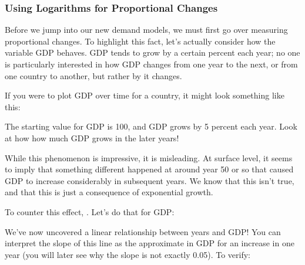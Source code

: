\documentclass[letterpaper,10pt,english]{jupyterBook}
\begin{document}
\subsubsection{Using Logarithms for Proportional Changes}
\label{\detokenize{content/01-demand/03-log-log:using-logarithms-for-proportional-changes}}
\sphinxAtStartPar
Before we jump into our new demand models, we must first go over measuring proportional changes.
To highlight this fact, let’s actually consider how the variable GDP behaves. GDP tends to grow by a certain percent each year; no one is particularly interested in how  GDP changes from one year to the next, or from one country to another, but rather by  it changes.

\sphinxAtStartPar
If you were to plot GDP over time for a country, it might look something like this:

\noindent{}

\sphinxAtStartPar
The starting value for GDP is 100, and GDP grows by 5 percent each year. Look at how how much GDP grows in the later years!

\sphinxAtStartPar
While this phenomenon is impressive, it is misleading. At surface level, it seems to imply that something different happened at around year 50 or so that caused GDP to increase considerably in subsequent years. We know that this isn’t true, and that this is just a consequence of exponential growth.

\sphinxAtStartPar
To counter this effect, . Let’s do that for GDP:

\noindent{}

\sphinxAtStartPar
We’ve now uncovered a linear relationship between years and GDP! You can interpret the slope of this line as the approximate  in GDP for an increase in one year (you will later see why the slope is not exactly 0.05). To verify:

\begin{sphinxVerbatim}[commandchars=\\\{\}]
 \PYG{p}{[}\PYG{p}{]}  \PYG{p}{[}\PYG{p}{]}
\end{sphinxVerbatim}
\end{document}
